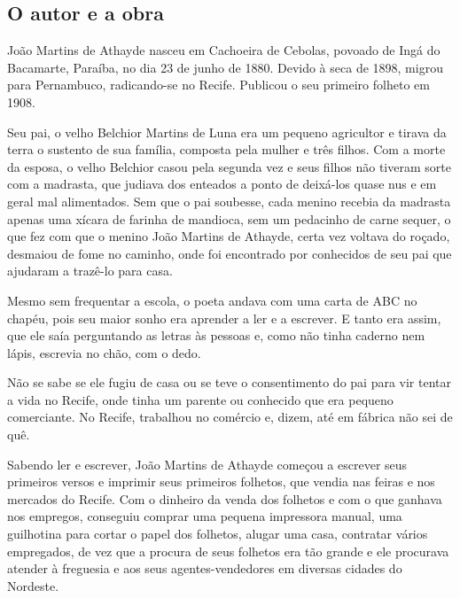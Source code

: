 \documentclass[12pt]{extarticle}
\begin{document}

\subsection{O autor e a obra}

João Martins de Athayde nasceu em Cachoeira de Cebolas, povoado de Ingá do
Bacamarte, Paraíba, no dia 23 de junho de 1880. Devido à seca de 1898, migrou
para Pernambuco, radicando-se no Recife. Publicou o seu primeiro folheto em
1908.


Seu pai, o velho Belchior Martins de Luna era um pequeno agricultor e tirava da
terra o sustento de sua família, composta pela mulher e três filhos. Com
a morte da esposa, o velho Belchior casou pela segunda vez e seus filhos não
tiveram sorte com a madrasta, que judiava dos enteados a ponto de deixá-los
quase nus e em geral mal alimentados. Sem que o pai soubesse, cada menino
recebia da madrasta apenas uma xícara de farinha de mandioca, sem um pedacinho
de carne sequer, o que fez com que o menino João Martins de Athayde, certa vez
voltava do roçado, desmaiou de fome no caminho, onde foi encontrado por
conhecidos de seu pai que ajudaram a trazê-lo para casa.

Mesmo sem frequentar a escola, o poeta andava com uma carta de ABC no chapéu,
pois seu maior sonho era aprender a ler e a escrever. E tanto era assim, que
ele saía perguntando as letras às pessoas e, como não tinha caderno nem lápis,
escrevia no chão, com o dedo.

Não se sabe se ele fugiu de casa ou se teve o consentimento do pai para vir
tentar a vida no Recife, onde tinha um parente ou conhecido que era pequeno
comerciante. No Recife, trabalhou no comércio e, dizem, até em fábrica não sei
de quê.

Sabendo ler e escrever, João Martins de Athayde começou a escrever seus
primeiros versos e imprimir seus primeiros folhetos, que vendia nas feiras
e nos mercados do Recife. Com o dinheiro da venda dos folhetos e com o que
ganhava nos empregos, conseguiu comprar uma pequena impressora manual, uma
guilhotina para cortar o papel dos folhetos, alugar uma casa, contratar vários
empregados, de vez que a procura de seus folhetos era tão grande e ele
procurava atender à freguesia e aos seus agentes-vendedores em diversas cidades
do Nordeste.
\end{document}
